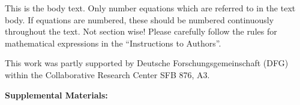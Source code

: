 \documentclass[bimj,fleqn]{w-art}
\theoremstyle{plain}
\theoremstyle{definition}
\begin{document}
\noindent This is the body text. Only number equations which are referred to in the text body. If equations
are numbered, these should be numbered continuously throughout the text. Not section wise! Please
carefully follow the rules for mathematical expressions in the ``Instructions to Authors''.

\begin{acknowledgement}
This work was partly supported by Deutsche Forschungsgemeinschaft (DFG) within the Collaborative Research Center SFB 876, A3.
\end{acknowledgement}
\vspace*{1pc}










\newpage
\phantom{aaaa}
\clearpage
\begin{center}
\textbf{\large Supplemental Materials: \newtitle}
\end{center}
\FloatBarrier
\setcounter{equation}{0}
\setcounter{figure}{0}
\setcounter{table}{0}
\setcounter{page}{1}
\makeatletter
\renewcommand{\theequation}{S\arabic{equation}}
\renewcommand{\thefigure}{S\arabic{figure}}
\renewcommand{\thetable}{S\arabic{table}}
\renewcommand{\bibnumfmt}[1]{[S#1]}


\end{document}

